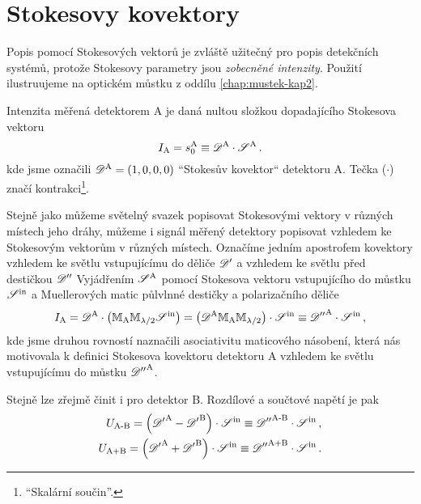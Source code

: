 \section{Stokesovy kovektory}
\label{app:kovektory}


Popis pomocí Stokesových vektorů je zvláště užitečný pro popis detekčních systémů, protože Stokesovy parametry jsou \emph{zobecněné intenzity}.
Použití ilustruujeme na optickém můstku z oddílu \ref{chap:mustek-kap2}.

Intenzita měřená detektorem A je daná nultou složkou dopadajícího Stokesova vektoru
\begin{equation}
    I_\textrm{A}=s_0^\textrm{A} \equiv \mathscr{D}^\textrm{A} \cdot \mathscr{S}^\textrm{A} \,.
\end{equation}
kde jsme označili $\mathscr{D}^\textrm{A}=(1, 0, 0, 0)$ ``Stokesův kovektor`` detektoru A. 
Tečka ($\cdot$) značí kontrakci\footnote{``Skalární součin''.}.

Stejně jako můžeme světelný svazek popisovat Stokesovými vektory v různých místech jeho dráhy, můžeme i signál měřený detektory popisovat vzhledem ke Stokesovým vektorům v různých místech.
Označíme jedním apostrofem kovektory vzhledem ke světlu vstupujícímu do děliče $\mathscr{D}'$ a vzhledem ke světlu před destičkou $\mathscr{D}''$
Vyjádřením $\mathscr{S}^\textrm{A}$ pomocí Stokesova vektoru vstupujícího do můstku $\mathscr{S}^\textrm{in}$ a Muellerových matic půlvlnné destičky a polarizačního děliče 
\begin{equation}
    I_\textrm{A}= \mathscr{D}^\textrm{A} \cdot \left( \mathbb{M}_\textrm{A} \mathbb{M}_{\lambda/2} \mathscr{S}^\textrm{in} \right) = \left( \mathscr{D}^\textrm{A} \mathbb{M}_\textrm{A} \mathbb{M}_{\lambda/2}\right) \cdot \mathscr{S}^\textrm{in} \equiv {\mathscr{D}''}^\textrm{A} \cdot \mathscr{S}^\textrm{in}  \,,
\end{equation}
kde jsme druhou rovností naznačili asociativitu maticového násobení, která nás motivovala k definici Stokesova kovektoru detektoru A vzhledem ke světlu vstupujícímu do můstku ${\mathscr{D}''}^\textrm{A}$.

Stejně lze zřejmě činit i pro detektor B.
Rozdílové a součtové napětí je pak
\begin{align}
\label{eqn:af}
U_\textrm{A-B} = \left( {\mathscr{D}'}^\textrm{A}-{\mathscr{D}'}^\textrm{B}\right) \cdot \mathscr{S}^\textrm{in} \equiv {\mathscr{D}''}^\textrm{A-B}\cdot \mathscr{S}^\textrm{in} \,, \\
U_\textrm{A+B} = \left({\mathscr{D}'}^\textrm{A}+{\mathscr{D}'}^\textrm{B}\right) \cdot \mathscr{S}^\textrm{in} \equiv {\mathscr{D}''}^\textrm{A+B}\cdot \mathscr{S}^\textrm{in} \,.
\end{align}

